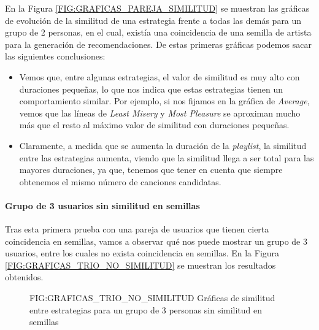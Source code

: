 En la Figura \ref{FIG:GRAFICAS_PAREJA_SIMILITUD} se muestran las gráficas de evolución de la similitud de una estrategia frente a 
todas las demás para un grupo de 2 personas, en el cual, existía una coincidencia de una semilla de artista para la generación de 
recomendaciones. De estas primeras gráficas podemos sacar las siguientes conclusiones:

\begin{itemize}
    \item Vemos que, entre algunas estrategias, el valor de similitud es muy alto con duraciones pequeñas, lo que nos indica que estas estrategias tienen
    un comportamiento similar. Por ejemplo, si nos fijamos en la gráfica de \textit{Average}, vemos que las líneas de \textit{Least Misery} y \textit{Most Pleasure}
    se aproximan mucho más que el resto al máximo valor de similitud con duraciones pequeñas.
    \item Claramente, a medida que se aumenta la duración de la \textit{playlist}, la similitud entre las estrategias aumenta, viendo que la similitud
    llega a ser total para las mayores duraciones, ya que, tenemos que tener en cuenta que siempre obtenemos el mismo número de canciones candidatas.
\end{itemize}

\paragraph{Grupo de 3 usuarios sin similitud en semillas}

Tras esta primera prueba con una pareja de usuarios que tienen cierta coincidencia en semillas, vamos a observar qué nos puede mostrar
un grupo de 3 usuarios, entre los cuales no exista coincidencia en semillas. En la Figura \ref{FIG:GRAFICAS_TRIO_NO_SIMILITUD} se muestran los
resultados obtenidos.

\begin{figure}[Gráficas de similitud entre estrategias para un grupo de 3 personas sin similitud en semillas]{FIG:GRAFICAS_TRIO_NO_SIMILITUD}
    {Gráficas de similitud entre estrategias para un grupo de 3 personas sin similitud en semillas}
\end{figure}

